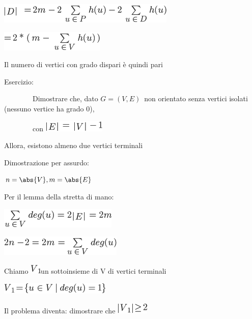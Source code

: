 \documentclass{article}
\begin{document}
{{}

\includegraphics{images/image373.png}

\includegraphics{images/image374.png}{~}

{Il numero di vertici con grado dispari è quindi pari}

{}

{Esercizio}{: }

{~~~~~~~~Dimostrare che, dato
}$G=(V,E)${~non orientato senza vertici
isolati (nessuno vertice ha grado 0),}

{~~~~~~~~con }\includegraphics{images/image375.png}

{Allora, esistono almeno due vertici terminali}

{}

{Dimostrazione per assurdo:}

$n=\abs{V},m=\abs{E}$

{Per il lemma della stretta di mano:}

\includegraphics{images/image377.png}

\includegraphics{images/image378.png}

{Chiamo }\includegraphics{images/image379.png}{un sottoinsieme di V di
vertici terminali}

\includegraphics{images/image380.png}

{Il problema diventa: dimostrare che
}\includegraphics{images/image381.png}

}
\end{document}

